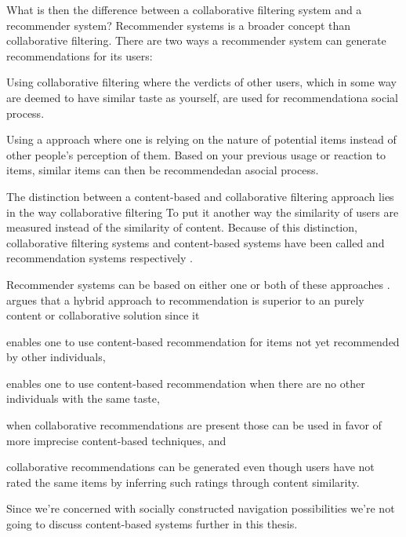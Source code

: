 What is then the difference between a collaborative
filtering system and a recommender system?
Recommender systems is a broader concept than collaborative
filtering. There are two ways a recommender system can generate
recommendations for its users:

\begin{enum}
  \item Using collaborative filtering
    where the verdicts of other users, which in some way are deemed to have
    similar taste as yourself, are used for recommendation\dash{}a social
    process.
  \item Using a  approach where one is relying on the
    nature of potential items instead of other people's perception of them.
    Based on your previous usage or reaction to items, similar items can then
    be recommended\dash{}an asocial process.
\end{enum}

The distinction between a content-based and collaborative filtering approach
lies in the way collaborative filtering  To put it another
way the similarity of users are measured instead of the similarity of content.
Because of this distinction, collaborative filtering systems
and content-based systems have been called  and
 recommendation systems respectively
\citep[]{greco04}.

Recommender systems can be based on either one or both of these approaches
\citep[]{herlocker00}. \citet[]{balabanovic97} argues that a
hybrid approach to recommendation is superior to an purely content or
collaborative solution since it
\begin{inparaenum}[(i)]
  \item enables one to use content-based recommendation for items
    not yet recommended by other individuals,
  \item enables one to use content-based recommendation when there are
    no other individuals with the same taste,
  \item when collaborative recommendations are present those can be
    used in favor of more imprecise content-based techniques, and
  \item collaborative recommendations can be generated even though users
    have not rated the same items by inferring such ratings through content
    similarity.
\end{inparaenum}
Since we're concerned with socially constructed navigation possibilities we're
not going to discuss content-based systems further in this thesis.

